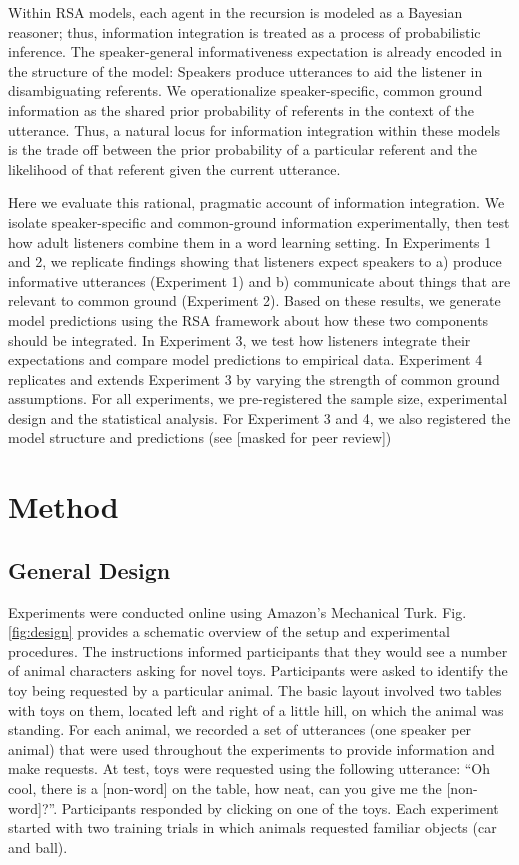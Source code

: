 \documentclass[10pt, letterpaper]{article}
\begin{document}
Within RSA models, each agent in the recursion is modeled as a Bayesian
reasoner; thus, information integration is treated as a process of
probabilistic inference. The speaker-general informativeness expectation
is already encoded in the structure of the model: Speakers produce
utterances to aid the listener in disambiguating referents. We
operationalize speaker-specific, common ground information as the shared
prior probability of referents in the context of the utterance. Thus, a
natural locus for information integration within these models is the
trade off between the prior probability of a particular referent and the
likelihood of that referent given the current utterance.

Here we evaluate this rational, pragmatic account of information
integration. We isolate speaker-specific and common-ground information
experimentally, then test how adult listeners combine them in a word
learning setting. In Experiments 1 and 2, we replicate findings showing
that listeners expect speakers to a) produce informative utterances
(Experiment 1) and b) communicate about things that are relevant to
common ground (Experiment 2). Based on these results, we generate model
predictions using the RSA framework about how these two components
should be integrated. In Experiment 3, we test how listeners integrate
their expectations and compare model predictions to empirical data.
Experiment 4 replicates and extends Experiment 3 by varying the strength
of common ground assumptions. For all experiments, we pre-registered the
sample size, experimental design and the statistical analysis. For
Experiment 3 and 4, we also registered the model structure and
predictions (see {[}masked for peer review{]})

\section{Method}\label{method}

\subsection{General Design}\label{general-design}

Experiments were conducted online using Amazon's Mechanical Turk. Fig.
\ref{fig:design} provides a schematic overview of the setup and
experimental procedures. The instructions informed participants that
they would see a number of animal characters asking for novel toys.
Participants were asked to identify the toy being requested by a
particular animal. The basic layout involved two tables with toys on
them, located left and right of a little hill, on which the animal was
standing. For each animal, we recorded a set of utterances (one speaker
per animal) that were used throughout the experiments to provide
information and make requests. At test, toys were requested using the
following utterance: ``Oh cool, there is a {[}non-word{]} on the table,
how neat, can you give me the {[}non-word{]}?''. Participants responded
by clicking on one of the toys. Each experiment started with two
training trials in which animals requested familiar objects (car and
ball).
\end{document}
